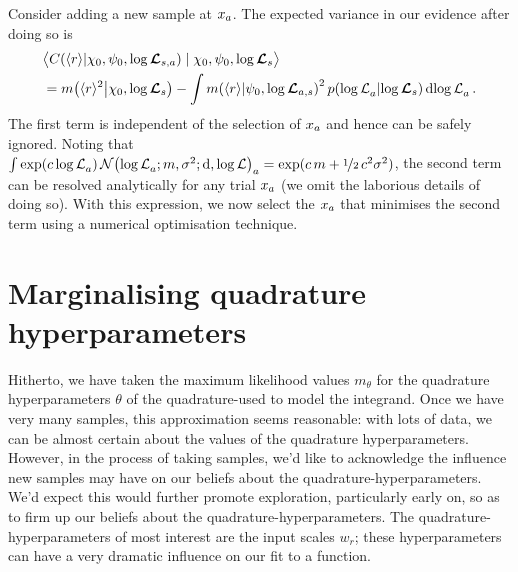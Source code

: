 \documentclass{article}
\begin{document}
Consider adding a new sample at $\lfv_a$. The expected variance in our evidence after doing so is
\begin{align}
& \bigl\langle \cov{\langle r\rangle}{\chi_0,\psi_0,\tvr_{s,a}}\mid \chi_0,\psi_0,\tvr_{s}\bigr\rangle\nonumber\\
& = \mean{\inty{r}^2}{\chi_0,\tvr_s}  - 
\int\mean{\inty{r}}{\psi_0,\tvr_{a,s}}^2\p{\tr_a}{\tvr_s}\ud\tr_a\,.\label{eqn:exp_var}
\end{align}
The first term is independent of the selection of $\lfv_a$ and hence can be safely ignored. Noting that $\int \exp(c\, \tr_a)\, \N{\tr_a;m, \sigma^2} \ud\tr_a = \exp(c\, m + \nicefrac{1}{2}\, c^2 \sigma^2)$, the second term can be resolved analytically for any trial $\lfv_a$ (we omit the laborious details of doing so). With this expression, we now select the $\lfv_a$ that minimises the second term using a numerical optimisation technique. 

\section{Marginalising quadrature hyperparameters}

Hitherto, we have taken the maximum likelihood values $m_\theta$ for the quadrature hyperparameters $\theta$ of the quadrature-\gpb used to model the integrand. Once we have very many samples, this approximation seems reasonable: with lots of data, we can be almost certain about the values of the quadrature hyperparameters. However, in the process of taking samples, we'd like to acknowledge the influence new samples may have on our beliefs about the quadrature-hyperparameters. We'd expect this would further promote exploration, particularly early on, so as to firm up our beliefs about the quadrature-hyperparameters. The quadrature-hyperparameters of most interest are the input scales $w_r$; these hyperparameters can have a very dramatic influence on our fit to a function.
\end{document}
